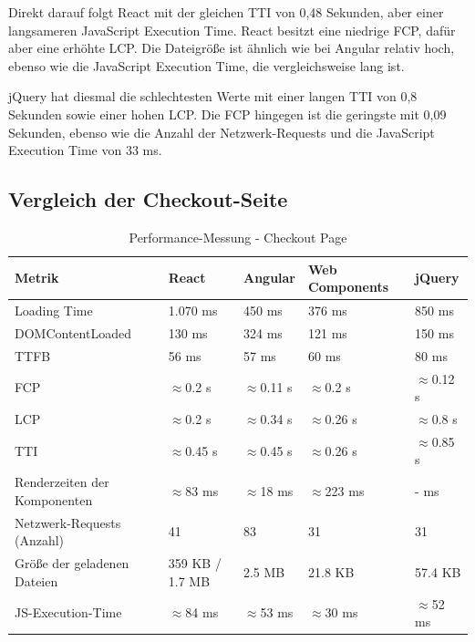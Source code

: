 \documentclass[oneside]{ausarbeitung}
\begin{document}
Direkt darauf folgt React mit der gleichen TTI von 0,48 Sekunden, aber einer langsameren JavaScript Execution Time. React besitzt eine niedrige FCP, dafür aber eine erhöhte LCP. Die Dateigröße ist ähnlich wie bei Angular relativ hoch, ebenso wie die JavaScript Execution Time, die vergleichsweise lang ist.

jQuery hat diesmal die schlechtesten Werte mit einer langen TTI von 0,8 Sekunden sowie einer hohen LCP. Die FCP hingegen ist die geringste mit 0,09 Sekunden, ebenso wie die Anzahl der Netzwerk-Requests und die JavaScript Execution Time von 33 ms.

\subsection{Vergleich der Checkout-Seite}

\begin{table}[H]
\centering
\caption{Performance-Messung - Checkout Page}
\begin{tabular}{|p{3.5cm}|p{2.5cm}|p{2.5cm}|p{2.5cm}|p{2.5cm}|}
\hline
\textbf{Metrik}                  & \textbf{React} & \textbf{Angular} & \textbf{Web Components} & \textbf{jQuery} \\ \hline
Loading Time                     & 1.070 ms      & 450 ms           & 376 ms                 & 850 ms          \\ \hline
DOMContentLoaded                 & 130 ms        & 324 ms           & 121 ms                 & 150 ms          \\ \hline
TTFB                             & 56 ms        & 57 ms            & 60 ms                  & 80 ms            \\ \hline
FCP                              & $\approx$0.2 s & $\approx$0.11 s & $\approx$0.2 s        & $\approx$0.12 s \\ \hline
LCP                              & $\approx$0.2 s & $\approx$0.34 s & $\approx$0.26 s       & $\approx$0.8 s \\ \hline
TTI                              & $\approx$0.45 s & $\approx$0.45 s & $\approx$0.26 s       & $\approx$0.85 s \\ \hline
Renderzeiten der Komponenten     & $\approx$83 ms         & $\approx$18 ms            & $\approx$223 ms                  & - ms           \\ \hline
Netzwerk-Requests (Anzahl)       & 41            & 83               & 31                    & 31              \\ \hline
Größe der geladenen Dateien      & 359 KB / 1.7 MB & 2.5 MB         & 21.8 KB               & 57.4 KB         \\ \hline
JS-Execution-Time                & $\approx$84 ms       & $\approx$53 ms          & $\approx$30 ms               & $\approx$52 ms         \\ \hline
\end{tabular}
\end{table}
\end{document}
